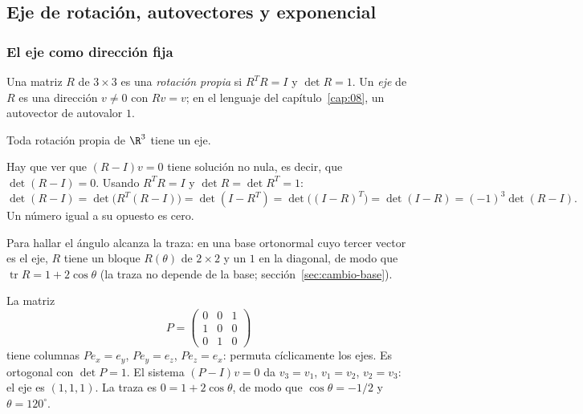 \subsection{Eje de rotación, autovectores y exponencial}\label{sec:eje-exp}

\subsubsection{El eje como dirección fija}

\begin{definicion}
Una matriz \(R\) de \(3\times3\) es una \emph{rotación propia} si \(R^TR=I\) y \(\det R=1\).
Un \emph{eje} de \(R\) es una dirección \(v\neq0\) con \(Rv=v\); en el lenguaje del
capítulo~\ref{cap:08}, un autovector de autovalor \(1\).
\end{definicion}

\begin{teorema}[Euler]\label{teo:euler-eje}
Toda rotación propia de \(\R^3\) tiene un eje.
\end{teorema}

\begin{demostracion}
Hay que ver que \((R-I)v=0\) tiene solución no nula, es decir, que \(\det(R-I)=0\). Usando
\(R^TR=I\) y \(\det R=\det R^T=1\):
\[
\det(R-I)=\det\bigl(R^T(R-I)\bigr)=\det(I-R^T)=\det\bigl((I-R)^T\bigr)=\det(I-R)
=(-1)^3\det(R-I).
\]
Un número igual a su opuesto es cero.
\end{demostracion}

Para hallar el ángulo alcanza la traza: en una base ortonormal cuyo tercer vector es el eje,
\(R\) tiene un bloque \(R(\theta)\) de \(2\times2\) y un \(1\) en la diagonal, de modo que
\(\operatorname{tr}R=1+2\cos\theta\) (la traza no depende de la base;
sección~\ref{sec:cambio-base}).

\begin{ejemplo}\label{ej:permutacion}
La matriz
\[
P=\begin{pmatrix}0&0&1\\1&0&0\\0&1&0\end{pmatrix}
\]
tiene columnas \(Pe_x=e_y\), \(Pe_y=e_z\), \(Pe_z=e_x\): permuta cíclicamente los ejes. Es
ortogonal con \(\det P=1\). El sistema \((P-I)v=0\) da \(v_3=v_1\), \(v_1=v_2\), \(v_2=v_3\):
el eje es \((1,1,1)\). La traza es \(0=1+2\cos\theta\), de modo que \(\cos\theta=-1/2\) y
\(\theta=120^\circ\).
\end{ejemplo}

